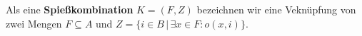 \begin{definition}[Spießkombination]\label{def:spiesskomb}
Als eine \textbf{Spießkombination} $K = (F, Z)$ bezeichnen wir eine Veknüpfung von zwei Mengen 
$F \subseteq A$ und $Z = \{i \in B \,|\, \exists x \in F : o(x, i)\}.$
\end{definition}
